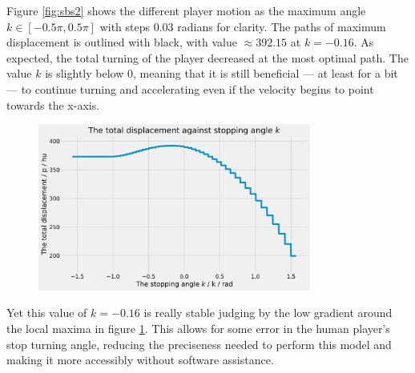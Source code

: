 Figure \ref{fig:sbs2} shows the different player motion as the maximum angle $k\in [-0.5\pi, 0.5\pi]$ with steps $0.03$ radians for clarity. The paths of maximum displacement is outlined with black, with value $\approx 392.15$ at $k=-0.16$. As expected, the total turning of the player decreased at the most optimal path. The value $k$ is slightly below $0$, meaning that it is still beneficial --- at least for a bit --- to continue turning and accelerating even if the velocity begins to point towards the x-axis.

\begin{figure}[H]
    \centering
    \includegraphics[width=0.8\textwidth]{assets/step_by_step_2k.png}
    \caption{}
    \label{fig:sbs2k}
\end{figure}

Yet this value of $k=-0.16$ is really stable judging by the low gradient around the local maxima in figure \ref{fig:sbs2k}. This allows for some error in the human player's stop turning angle, reducing the preciseness needed to perform this model and making it more accessibly without software assistance.


